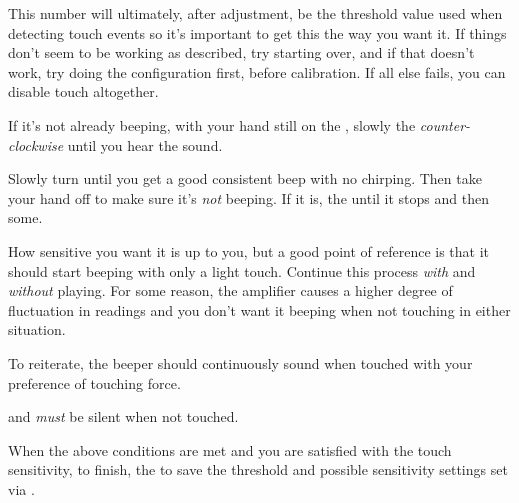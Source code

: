 \par\medskip

This number will ultimately, after adjustment, be the threshold value used when
detecting touch events so it's important to get this the way you want it.  If
things don't seem to be working as described, try starting over, and if that
doesn't work, try doing the configuration first, before calibration.  If all
else fails, you can disable touch altogether.

\par\medskip

If it's not already beeping, with your hand still on the , slowly 
the  \textit{counter-clockwise} until you hear the
\hyperref[Beeper]{} sound.


Slowly turn until you get a good consistent beep with no chirping.  Then take
your hand off to make sure it's \textit{not} beeping.  If it is,  the
  until it stops and then some.


How sensitive you want it is up to you, but a good point of reference is that
it should start beeping with only a light touch.  Continue this process
\textit{with} and \textit{without}  playing.  For some reason, the
amplifier causes a higher degree of fluctuation in readings and you don't want
it beeping when not touching in either situation.


To reiterate, the beeper should continuously sound when touched with your preference of
touching force.


and \textit{must} be silent when not touched.


When the above conditions are met and you are satisfied with the touch
sensitivity, to finish,  the  to save the threshold and possible
sensitivity settings set via \hyperref[Touch Configuration]{}.

